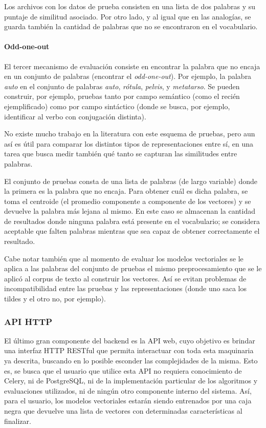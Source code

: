 Los archivos con los datos de prueba consisten en una lista de dos palabras y su puntaje de
similitud asociado. Por otro lado, y al igual que en las analogías, se guarda también la cantidad de
palabras que no se encontraron en el vocabulario.


\paragraph{Odd-one-out}

El tercer mecanismo de evaluación consiste en encontrar la palabra que no encaja en un conjunto de
palabras (encontrar el \textit{odd-one-out}). Por ejemplo, la palabra \textit{auto} en el conjunto
de palabras \textit{auto}, \textit{rótula}, \textit{pelvis}, y \textit{metatarso}. Se pueden
construir, por ejemplo, pruebas tanto por campo semántico (como el recién ejemplificado) como por
campo sintáctico (donde se busca, por ejemplo, identificar al verbo con conjugación distinta).

No existe mucho trabajo en la literatura con este esquema de pruebas, pero aun así es útil para
comparar los distintos tipos de representaciones entre sí, en una tarea que busca medir también qué
tanto se capturan las similitudes entre palabras.

El conjunto de pruebas consta de una lista de palabras (de largo variable) donde la primera es la
palabra que no encaja. Para obtener cuál es dicha palabra, se toma el centroide (el promedio
componente a componente de los vectores) y se devuelve la palabra más lejana al mismo. En este caso
se almacenan la cantidad de resultados donde ninguna palabra está presente en el vocabulario; se
considera aceptable que falten palabras mientras que sea capaz de obtener correctamente el
resultado.

\quad

Cabe notar también que al momento de evaluar los modelos vectoriales se le aplica a las palabras del
conjunto de pruebas el mismo preprocesamiento que se le aplicó al corpus de texto al construir los
vectores. Así se evitan problemas de incompatibilidad entre las pruebas y las representaciones
(donde uno saca los tildes y el otro no, por ejemplo).


\subsubsection{API HTTP}

El último gran componente del backend es la API web, cuyo objetivo es brindar una interfaz HTTP
RESTful que permita interactuar con toda esta maquinaria ya descrita, buscando en lo posible
esconder las complejidades de la misma. Esto es, se busca que el usuario que utilice esta API no
requiera conocimiento de Celery, ni de PostgreSQL, ni de la implementación particular de los
algoritmos y evaluaciones utilizados, ni de ningún otro componente interno del sistema. Así, para el
usuario, los modelos vectoriales estarán siendo entrenados por una caja negra que devuelve una lista
de vectores con determinadas características al finalizar.

